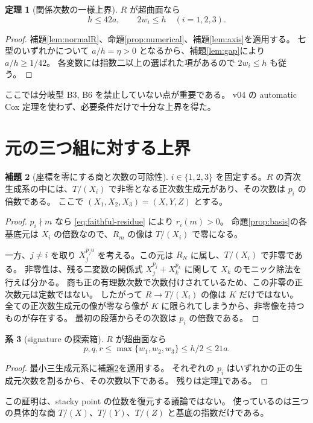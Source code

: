 \documentclass[11pt,a4paper]{ltjsarticle}
\numberwithin{equation}{section}
\theoremstyle{definition}
\newtheorem{theorem}{定理}[section]
\newtheorem{lemma}[theorem]{補題}
\newtheorem{corollary}[theorem]{系}
\begin{document}
\begin{theorem}[関係次数の一様上界]\label{thm:hbound}
$R$ が超曲面なら
\[
 h\le42a,\qquad 2w_i\le h\quad(i=1,2,3).
\]
\end{theorem}
\begin{proof}
補題\ref{lem:normalR}、命題\ref{prop:numerical}、補題\ref{lem:axis}を適用する。
七型のいずれかについて $a/h=\eta>0$ となるから、補題\ref{lem:gap}により $a/h\ge1/42$。
各変数には指数二以上の選ばれた項があるので $2w_i\le h$ も従う。
\end{proof}
ここでは分岐型 B3, B6 を禁止していない点が重要である。
v04 の automatic Cox 定理を使わず、必要条件だけで十分な上界を得た。

\section{元の三つ組に対する上界}\label{sec:signature}
\begin{lemma}[座標を零にする商と次数の可除性]\label{lem:coordinate}
$i\in\{1,2,3\}$ を固定する。$R$ の斉次生成系の中には、$T/(X_i)$ で非零となる正次数生成元があり、その次数は $p_i$ の倍数である。
ここで $(X_1,X_2,X_3)=(X,Y,Z)$ とする。
\end{lemma}
\begin{proof}
$p_i\nmid m$ なら \eqref{eq:faithful-residue} により $r_i(m)>0$。
命題\ref{prop:basis}の各基底元は $X_i$ の倍数なので、$R_m$ の像は $T/(X_i)$ で零になる。

一方、$j\ne i$ を取り $X_j^{p_j u}$ を考える。この元は $R_N$ に属し、$T/(X_i)$ で非零である。
非零性は、残る二変数の関係式 $X_j^{p_j}+X_k^{p_k}$ に関して $X_k$ のモニック除法を行えば分かる。
商も正の有理数次数で次数付けされているため、この非零の正次数元は定数ではない。
したがって $R\to T/(X_i)$ の像は $K$ だけではない。
全ての正次数生成元の像が零なら像が $K$ に限られてしまうから、非零像を持つものが存在する。
最初の段落からその次数は $p_i$ の倍数である。
\end{proof}

\begin{corollary}[signature の探索箱]\label{cor:signature}
$R$ が超曲面なら
\begin{equation}\label{eq:21a}
 p,q,r\le \max\{w_1,w_2,w_3\}\le h/2\le21a.
\end{equation}
\end{corollary}
\begin{proof}
最小三生成元系に補題\ref{lem:coordinate}を適用する。
それぞれの $p_i$ はいずれかの正の生成元次数を割るから、その次数以下である。
残りは定理\ref{thm:hbound}である。
\end{proof}
この証明は、stacky point の位数を復元する議論ではない。
使っているのは三つの具体的な商 $T/(X)$、$T/(Y)$、$T/(Z)$ と基底の指数だけである。
\end{document}
